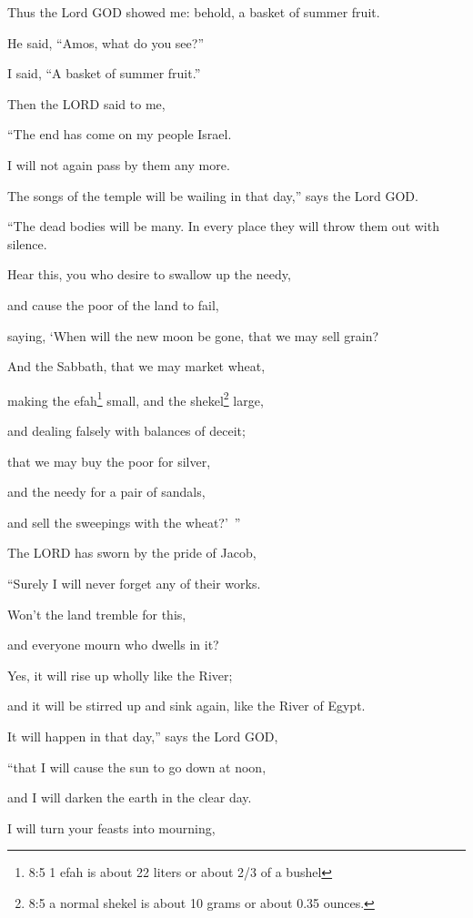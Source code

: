 	
	\mychapter{} \myverse*{}Thus the Lord GOD showed me: behold, a basket of summer fruit.
	
	\myverse{}He said, “Amos, what do you see?”
	
	I said, “A basket of summer fruit.”
	
	Then the LORD said to me,
	
	“The end has come on my people Israel.
	
	I will not again pass by them any more.
	
	\myverse{}The songs of the temple will be wailing in that day,” says the
	Lord GOD.
	
	“The dead bodies will be many. In every place they will throw them out with silence.
	
	\myverse{}Hear this, you who desire to swallow up the needy,
	
	and cause the poor of the land to fail,
	
	\myverse{}saying, ‘When will the new moon be gone, that we may
	sell grain?
	
	And the Sabbath, that we may market wheat,
	
	making the efah\footnote{8:5 1 efah is about 22 liters or about 2/3 of a bushel
	} small, and the shekel\footnote{8:5 a normal shekel is about 10 grams or about 0.35 ounces.} large,
	
	and dealing falsely with balances of deceit;
	
	\myverse{}that we may buy the poor for silver,
	
	and the needy for a pair of sandals,
	
	and sell the sweepings with the wheat?’ ”
	
	\myverse{}The LORD has sworn by the pride of Jacob,
	
	“Surely I will never forget any of their works.
	
	\myverse{}Won’t the land tremble for this,
	
	and everyone mourn who dwells in it?
	
	Yes, it will rise up wholly like the River;
	
	and it will be stirred up and sink again, like the River of Egypt.
	
	\myverse{}It will happen in that day,” says the Lord GOD,
	
	“that I will cause the sun to go down at noon,
	
	and I will darken the earth in the clear day.
	
	\myverse{}I will turn your feasts into mourning,
	
